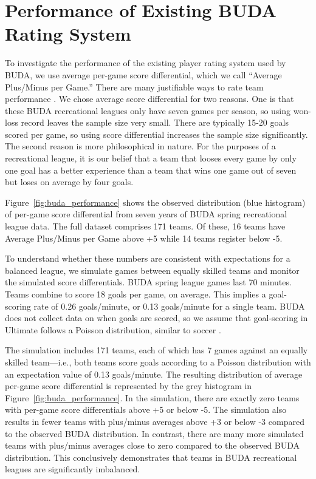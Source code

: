 \section{Performance of Existing BUDA Rating System}\label{sec:existing_performance}

To investigate the performance of the existing player rating system used by BUDA, we use average per-game score differential, which we call ``Average Plus/Minus per Game.'' There are many justifiable ways to rate team performance \cite{Langville_2012}.  We chose average score differential for two reasons.  One is that these BUDA recreational leagues only have seven games per season, so using won-loss record leaves the sample size very small.  There are typically 15-20 goals scored per game, so using score differential increases the sample size significantly.  The second reason is more philosophical in nature.  For the purposes of a recreational league, it is our belief that a team that looses every game by only one goal has a better experience than a team that wins one game out of seven but loses on average by four goals.  

Figure~\ref{fig:buda_performance} shows the observed distribution (blue histogram) of per-game score differential from seven years of BUDA spring recreational league data.  The full dataset comprises 171 teams.  Of these, 16 teams have Average Plus/Minus per Game above +5 while 14 teams register below -5.  

To understand whether these numbers are consistent with expectations for a balanced league, we simulate games between equally skilled teams and monitor the simulated score differentials.  BUDA spring league games last 70 minutes.  Teams combine to score 18 goals per game, on average. This implies a goal-scoring rate of 0.26 goals/minute, or 0.13 goals/minute for a single team.  BUDA does not collect data on when goals are scored, so we assume that goal-scoring in Ultimate follows a Poisson distribution, similar to soccer \cite{Heuer_2010}.

The simulation includes 171 teams, each of which has 7 games against an equally skilled team---i.e., both teams score goals according to a Poisson distribution with an expectation value of 0.13 goals/minute. The resulting distribution of average per-game score differential is represented by the grey histogram in Figure~\ref{fig:buda_performance}.  In the simulation, there are exactly zero teams with per-game score differentials above +5 or below -5.  The simulation also results in fewer teams with plus/minus averages above +3 or below -3 compared to the observed BUDA distribution.  In contrast, there are many more simulated teams with plus/minus averages close to zero compared to the observed BUDA distribution.  This conclusively demonstrates that teams in BUDA recreational leagues are significantly imbalanced.

